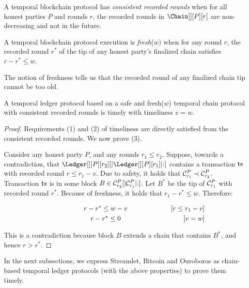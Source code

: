 \begin{definition}
  A temporal blockchain protocol has \emph{consistent recorded rounds}
  when for all honest parties $P$ and rounds $r$,
  the recorded rounds in $\Chain[][P][r]$ are non-decreasing and not
  in the future.
\end{definition}

\begin{definition}[Freshness] \label{def:tip-freshness}
  A temporal blockchain protocol execution is \emph{fresh}($w$) when for
  any round $r$, the recorded round
  $r^*$ of the tip of any honest party's finalized chain
  satisfies $r - r^* \leq w$.
\end{definition}

The notion of freshness tells us that the recorded round
of any finalized chain tip cannot be too old.

\begin{theorem} \label{thm:freshness-to-timeliness}
  A temporal ledger protocol based on a safe and fresh($w$)
  temporal chain protocol with consistent recorded rounds is timely with timeliness $v = w$.
\end{theorem}
\begin{proof}
  Requirements (1) and (2) of timeliness are directly satisfied from
  the consistent recorded rounds.
  We now prove (3).

  Consider any honest party $P$, and any rounds $r_1 \leq r_2$.
  Suppose, towards a contradiction, that $\Ledger[][P][r_2][|\Ledger[][P][r_1]|{:}]$
  contains a transaction $\textsf{tx}$ with recorded round $r \leq r_1 - v$.
  Due to safety, it holds that $\mathcal{C}^P_{r_1} \prec \mathcal{C}^P_{r_2}$.
  Transaction $\textsf{tx}$ is in some block $B \in \mathcal{C}^P_{r_2}[|\mathcal{C}^P_{r_1}|{:}]$.
  Let $B^*$ be the tip of $\mathcal{C}^P_{r_1}$ with recorded round $r^*$.
  Because of freshness, it holds that $r_1 - r^* \leq w$.
  Therefore:

  \begin{align*}
    \makebox[0.5\textwidth][c]{$r - r^* \leq w - v$}         && \text{[$r \leq r_1 - v$]} \\
    \makebox[0.5\textwidth][c]{$r - r^* \leq 0$}             && \text{[$v = w$]}
  \end{align*}

  This is a contradiction because block $B$ extends a chain that contains $B^*$,
  and hence $r > r^*$.
  \Qed
\end{proof}

In the next subsections, we express Streamlet, Bitcoin and Ouroboros
as chain-based temporal ledger protocols (with the above properties) to
prove them timely.
